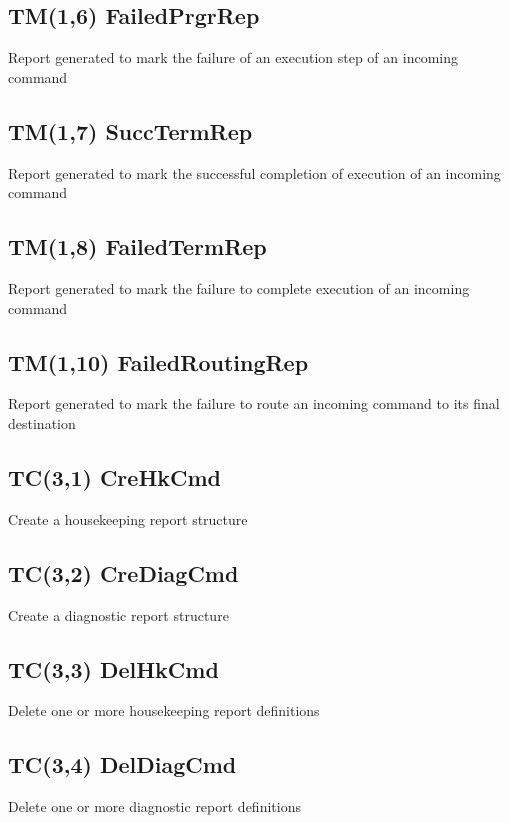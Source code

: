 \pagebreak
\subsection{TM(1,6) FailedPrgrRep}
Report generated to mark the failure of an execution step of an incoming command

\pagebreak
\subsection{TM(1,7) SuccTermRep}
Report generated to mark the successful completion of execution of an incoming command

\pagebreak
\subsection{TM(1,8) FailedTermRep}
Report generated to mark the failure to complete execution of an incoming command

\pagebreak
\subsection{TM(1,10) FailedRoutingRep}
Report generated to mark the failure to route an incoming command to its final destination

\pagebreak
\subsection{TC(3,1) CreHkCmd}
Create a housekeeping report structure

\pagebreak
\subsection{TC(3,2) CreDiagCmd}
Create a diagnostic report structure

\pagebreak
\subsection{TC(3,3) DelHkCmd}
Delete one or more housekeeping report definitions

\pagebreak
\subsection{TC(3,4) DelDiagCmd}
Delete one or more diagnostic report definitions

